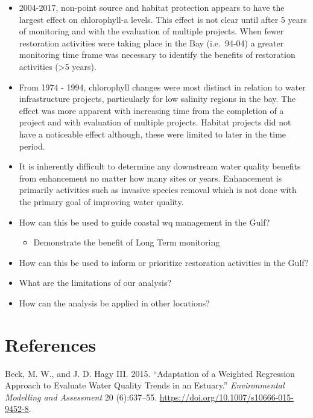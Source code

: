\documentclass[]{article}
\providecommand{\tightlist}{%
  \setlength{\itemsep}{0pt}\setlength{\parskip}{0pt}}
\begin{document}
\begin{itemize}
\item
  2004-2017, non-point source and habitat protection appears to have the
  largest effect on chlorophyll-a levels. This effect is not clear until
  after 5 years of monitoring and with the evaluation of multiple
  projects. When fewer restoration activities were taking place in the
  Bay (i.e.~94-04) a greater monitoring time frame was necessary to
  identify the benefits of restoration activities (\textgreater{}5
  years).
\item
  From 1974 - 1994, chlorophyll changes were most distinct in relation
  to water infrastructure projects, particularly for low salinity
  regions in the bay. The effect was more apparent with increasing time
  from the completion of a project and with evaluation of multiple
  projects. Habitat projects did not have a noticeable effect although,
  these were limited to later in the time period.
\item
  It is inherently difficult to determine any downstream water quality
  benefits from enhancement no matter how many sites or years.
  Enhancement is primarily activities such as invasive species removal
  which is not done with the primary goal of improving water quality.
\item
  How can this be used to guide coastal wq management in the Gulf?

  \begin{itemize}
  \tightlist
  \item
    Demonstrate the benefit of Long Term monitoring
  \end{itemize}
\item
  How can this be used to inform or prioritize restoration activities in
  the Gulf?
\item
  What are the limitations of our analysis?
\item
  How can the analysis be applied in other locations?
\end{itemize}

\hypertarget{references}{%
\section*{References}\label{references}}

\hypertarget{refs}{}
\leavevmode\hypertarget{ref-Beck15}{}%
Beck, M. W., and J. D. Hagy III. 2015. ``Adaptation of a Weighted
Regression Approach to Evaluate Water Quality Trends in an Estuary.''
\emph{Environmental Modelling and Assessment} 20 (6):637--55.
\url{https://doi.org/10.1007/s10666-015-9452-8}.
\end{document}

